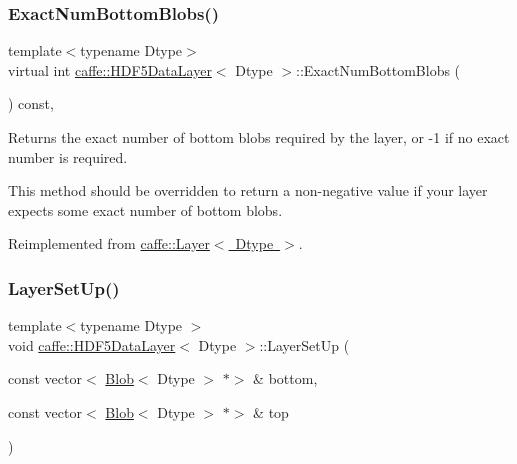 \subsubsection{\texorpdfstring{Exact\+Num\+Bottom\+Blobs()}{ExactNumBottomBlobs()}\hspace{0.1cm}{\footnotesize\ttfamily [2/2]}}
{\footnotesize\ttfamily template$<$typename Dtype$>$ \\
virtual int \mbox{\hyperlink{classcaffe_1_1_h_d_f5_data_layer}{caffe\+::\+H\+D\+F5\+Data\+Layer}}$<$ Dtype $>$\+::Exact\+Num\+Bottom\+Blobs (\begin{DoxyParamCaption}{ }\end{DoxyParamCaption}) const\hspace{0.3cm}{\ttfamily [inline]}, {\ttfamily [virtual]}}



Returns the exact number of bottom blobs required by the layer, or -\/1 if no exact number is required. 

This method should be overridden to return a non-\/negative value if your layer expects some exact number of bottom blobs. 

Reimplemented from \mbox{\hyperlink{classcaffe_1_1_layer_a8e5ee0494d85f5f55fc4396537cbc60f}{caffe\+::\+Layer$<$ Dtype $>$}}.

\mbox{\label{classcaffe_1_1_h_d_f5_data_layer_afcd473ff34b4035122ba9119fc67498c}} 
\subsubsection{\texorpdfstring{Layer\+Set\+Up()}{LayerSetUp()}\hspace{0.1cm}{\footnotesize\ttfamily [1/2]}}
{\footnotesize\ttfamily template$<$typename Dtype $>$ \\
void \mbox{\hyperlink{classcaffe_1_1_h_d_f5_data_layer}{caffe\+::\+H\+D\+F5\+Data\+Layer}}$<$ Dtype $>$\+::Layer\+Set\+Up (\begin{DoxyParamCaption}\item[{const vector$<$ \mbox{\hyperlink{classcaffe_1_1_blob}{Blob}}$<$ Dtype $>$ $\ast$$>$ \&}]{bottom,  }\item[{const vector$<$ \mbox{\hyperlink{classcaffe_1_1_blob}{Blob}}$<$ Dtype $>$ $\ast$$>$ \&}]{top }\end{DoxyParamCaption})\hspace{0.3cm}{\ttfamily [virtual]}}




